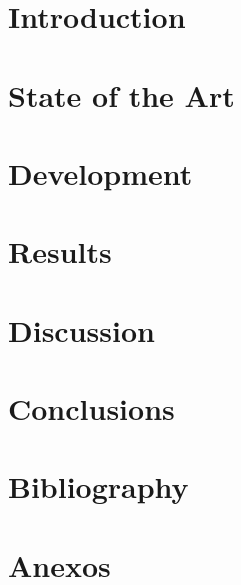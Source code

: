 \documentclass[11pt]{report} %
\begin{document}
\tableofcontents
\newpage

\onehalfspacing%

\chapter{Introduction} %

\chapter{State of the Art} %

\chapter{Development} %

\chapter{Results} %

\chapter{Discussion} %

\chapter{Conclusions} %

\chapter{Bibliography} %

\chapter{Anexos}
 
\end{document}
